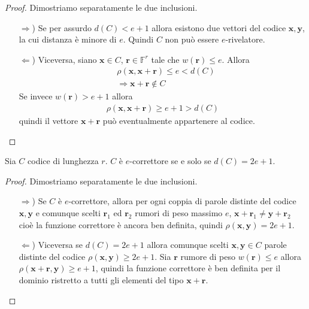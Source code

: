 \begin{proof}
   Dimostriamo separatamente le due inclusioni.
   \begin{itemize}
   \item[$\Rightarrow$)] Se per assurdo $d(C) < e+1 $ allora esistono due vettori del codice $\mathbf{x}, \mathbf{y}$, la cui distanza è minore di $e$. Quindi $C$ non può essere $e$-rivelatore.
   \item[$\Leftarrow$)] Viceversa, siano $\mathbf{x} \in C$, $\mathbf{r} \in \mathbb{F}^{r}$ tale che $w(\mathbf{r}) \leq e$. Allora
   \begin{align*}
     &\rho(\mathbf{x}, \mathbf{x}+\mathbf{r}) \leq e < d(C) \\
     &\Rightarrow \mathbf{x}+\mathbf{r} \notin C
   \end{align*}
   Se invece $w(\mathbf{r}) > e + 1$ allora
   \begin{align*}
     \rho(\mathbf{x}, \mathbf{x}+\mathbf{r}) \geq e+1 > d(C)
   \end{align*}
   quindi il vettore $\mathbf{x}+\mathbf{r}$ può eventualmente appartenere al codice.
\end{itemize}
\end{proof}

\begin{prop}\label{cap2_1:propcodici2}
   Sia $C$ codice di lunghezza $r$. $C$ è $e$-correttore se e solo se $d(C)= 2e+1$.
\end{prop}
\begin{proof}
   Dimostriamo separatamente le due inclusioni.
   \begin{itemize}
   \item[$\Rightarrow$)] Se $C$ è $e$-correttore, allora per ogni coppia di parole distinte del codice $\mathbf{x}, \mathbf{y}$ e comunque scelti $\mathbf{r}_{1}$ ed $\mathbf{r}_{2}$ rumori di peso massimo $e$, $\mathbf{x}+\mathbf{r}_{1} \neq \mathbf{y}+\mathbf{r}_{2}$ cioè la funzione correttore è ancora ben definita,  quindi $\rho(\mathbf{x},\mathbf{y}) = 2e + 1$.
   \item[$\Leftarrow$)] Viceversa se $d(C) = 2e + 1$ allora comunque scelti $\mathbf{x}, \mathbf{y} \in C$ parole distinte del codice $\rho(\mathbf{x},\mathbf{y}) \geq 2e+1$. Sia $\mathbf{r}$ rumore di peso $w(\mathbf{r}) \leq e$ allora $\rho(\mathbf{x} + \mathbf{r},\mathbf{y}) \geq e+1$, quindi la funzione correttore è ben definita per il dominio ristretto a tutti gli elementi del tipo $\mathbf{x} + \mathbf{r}$.
\end{itemize}
\end{proof}

